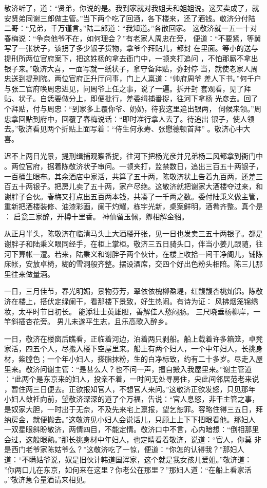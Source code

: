 敬济听了，道：“贤弟，你说的是。我到家就对我姐夫和姐姐说。这买卖成了，就
安贤弟同谢三郎做主管。”当下两个吃了回酒，各下楼来，还了酒钱。敬济分付陆
二哥：“兄弟，千万谨言。”陆二郎道：“我知道。”各散回家。
这敬济就一五一十对春梅说：“争奈他爷不在，如何理会？”有老家人周忠在旁，
便道：“不要紧，等舅写了一张状子，该拐了多少银子货物，拿爷个拜贴儿，都封
在里面。等小的送与提刑所两位官府案下，把这姓杨的拿去衙门中，一顿夹打追问
，不怕那厮不拿出银子来。”敬济大喜，一面写就一纸状子，拿守备拜贴，弥封停
当，就使老家人周忠送到提刑院。两位官府正升厅问事，门上人禀道：“帅府周爷
差人下书。”何千户与张二官府唤周忠进见，问周爷上任之事，说了一遍。拆开封
套观看，见了拜贴、状子。自恁要做分上，即便批行，差委缉捕番捉，往河下拿杨
光彦去。回了个拜贴，付与周忠：“到家多上覆你爷、奶奶，待我这里追出银两，
伺候来领。”周忠拿回贴到府中，回覆了春梅说话：“即时准行拿人去了。待追出
银子，使人领去。”敬济看见两个折贴上面写着：“侍生何永寿、张懋德顿首拜”
。敬济心中大喜。

迟不上两日光景，提刑缉捕观察番捉，往河下把杨光彦并兄弟杨二风都拿到衙门中
。两位官府，据着陈敬济状子审问。一顿夹打，监禁数日，追出三百五十两银子，
一百桶生眼布。其余酒店中家活，共算了五十两，陈敬济状上告着九百两，还差三
百五十两银子。把房儿卖了五十两，家产尽绝。这敬济就把谢家大酒楼夺过来，和
谢胖子合伙。春梅又打点出五百两本钱，共凑了一千两之数。委付陆秉义做主管，
重新把酒楼装修、油漆彩画，阑干灼耀，栋宇光新，桌案鲜明，酒肴齐整。真个是
：
启瓮三家醉，开樽十里香。
神仙留玉佩，卿相解金貂。

从正月半头，陈敬济在临清马头上大酒楼开张，见一日也发卖三五十两银子。都是
谢胖子和陆秉义眼同经手，在柜上掌柜。敬济三五日骑头口，伴当小姜儿跟随，往
河下算帐一遭。若来，陆秉义和谢胖子两个伙计，在楼上收拾一间干净阁儿，铺陈
床帐，安放卓椅，糊的雪洞般齐整。摆设酒席，交四个好出色粉头相陪。陈三儿那
里往来做量酒。

一日，三月佳节，春光明媚，景物芬芳，翠依依槐柳盈堤，红馥馥杏桃灿锦。陈敬
济在楼上，搭伏定绿阑干，看那楼下景致，好生热闹。有诗为证：
风拂烟笼锦绣妆，太平时节日初长。
能添壮士英雄胆，善解佳人愁闷肠。
三尺晓垂杨柳岸，一竿斜插杏花旁。
男儿未遂平生志，且乐高歌入醉乡。

一日，敬济在楼窗后瞧看，正临着河边，泊着两只剥船。船上载着许多箱笼，卓凳
家活，四五个人，尽搬入楼下空屋里来。船上有两个妇人，一个中年妇人，长挑身
材，紫膛色；一个年小妇人，搽脂抹粉，生的白净标致，约有二十多岁。尽走入屋
里来。敬济问谢主管：“是甚么人？也不问一声，擅自搬入我屋里来。”谢主管道
：“此两个是东京来的妇人，投亲不着，一时间无处寻房住，央此间邻居范老来说
，暂住两三日便去。正欲报知官人，不想官人来问。”这敬济正欲发怒，只见那年
小妇人敛衽向前，望敬济深深的道了个万福，告说：“官人息怒，非干主管之事，
是奴家大胆，一时出于无奈，不及先来宅上禀报，望乞恕罪。容略住得三五日，拜
纳房金，就便搬去。”这敬济见小妇人会说话儿，只顾上上下下把眼看他。那妇人
一双星眼斜盼敬济，两情四目，不能定情。敬济口中不言，心内暗想：“倒相那里
会过，这般眼熟。”那长挑身材中年妇人，也定睛看着敬济，说道：“官人，你莫
非是西门老爷家陈姑爷么？”这敬济吃了一惊，便道：“你怎的认得我？”那妇人
道：“不瞒姑爷说，奴是旧伙计韩道国浑家，这个就是我女孩儿爱姐。”敬济道：
”你两口儿在东京，如何来在这里？你老公在那里？”那妇人道：“在船上看家活
。”敬济急令量酒请来相见。

